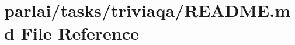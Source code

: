 \hypertarget{parlai_2tasks_2triviaqa_2README_8md}{}\section{parlai/tasks/triviaqa/\+R\+E\+A\+D\+ME.md File Reference}
\label{parlai_2tasks_2triviaqa_2README_8md}

